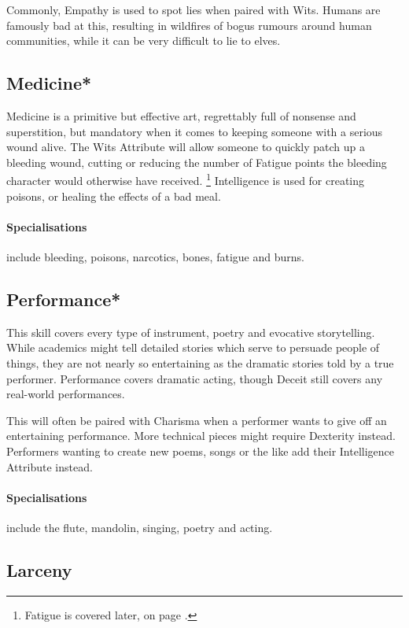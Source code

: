 \documentclass[titlepage,a4paper,openany]{book}
\begin{document}
\begin{multicols}{2}
Commonly, Empathy is used to spot lies when paired with Wits. Humans are famously bad at this, resulting in wildfires of bogus rumours around human communities, while it can be very difficult to lie to elves.

\subsection{Medicine*}

Medicine is a primitive but effective art, regrettably full of nonsense and superstition, but mandatory when it comes to keeping someone with a serious wound alive.
The Wits Attribute will allow someone to quickly patch up a bleeding wound, cutting or reducing the number of Fatigue points the bleeding character would otherwise have received.
\footnote{Fatigue is covered later, on page \pageref{fatigue}.}
Intelligence is used for creating poisons, or healing the effects of a bad meal.

\paragraph{Specialisations} include bleeding, poisons, narcotics, bones, fatigue and burns.

\subsection{Performance*}

This skill covers every type of instrument, poetry and evocative storytelling. While academics might tell detailed stories which serve to persuade people of things, they are not nearly so entertaining as the dramatic stories told by a true performer. Performance covers dramatic acting, though Deceit still covers any real-world performances.

This will often be paired with Charisma when a performer wants to give off an entertaining performance. More technical pieces might require Dexterity instead. Performers wanting to create new poems, songs or the like add their Intelligence Attribute instead.

\paragraph{Specialisations} include the flute, mandolin, singing, poetry and acting.

\subsection{Larceny}


\end{multicols}
\end{document}
